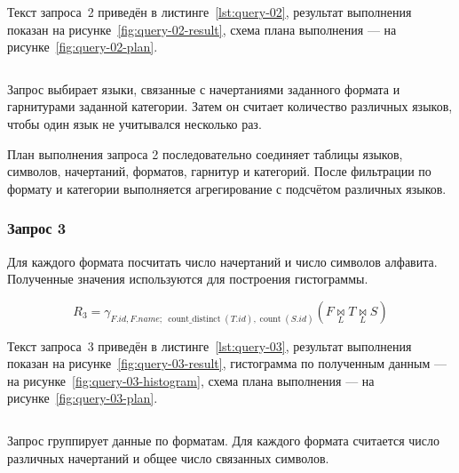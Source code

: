 Текст запроса~2 приведён в листинге~\ref{lst:query-02}, результат выполнения показан на рисунке~\ref{fig:query-02-result}, схема плана выполнения --- на рисунке~\ref{fig:query-02-plan}.

\label{lst:query-02}
\vspace{-10pt}
\inputminted[linenos, numbersep=10pt, firstnumber=1, fontsize=\small]{sql}{../src/queries/query_02.sql}

Запрос выбирает языки, связанные с начертаниями заданного формата и гарнитурами заданной категории. Затем он считает количество различных языков, чтобы один язык не учитывался несколько раз.


План выполнения запроса 2 последовательно соединяет таблицы языков, символов, начертаний, форматов, гарнитур и категорий. После фильтрации по формату и категории выполняется агрегирование с подсчётом различных языков.


\subsubsection{Запрос 3}

Для каждого формата посчитать число начертаний и число символов алфавита. Полученные значения используются для построения гистограммы.

\[
R_3 =
\gamma_{F.id,F.name;\ \operatorname{count\_distinct}(T.id),\operatorname{count}(S.id)}
(F \underset{L}{\bowtie} T \underset{L}{\bowtie} S)
\]

Текст запроса~3 приведён в листинге~\ref{lst:query-03}, результат выполнения показан на рисунке~\ref{fig:query-03-result}, гистограмма по полученным данным --- на рисунке~\ref{fig:query-03-histogram}, схема плана выполнения --- на рисунке~\ref{fig:query-03-plan}.

\label{lst:query-03}
\vspace{-10pt}
\inputminted[linenos, numbersep=10pt, firstnumber=1, fontsize=\small]{sql}{../src/queries/query_03.sql}

Запрос группирует данные по форматам. Для каждого формата считается число различных начертаний и общее число связанных символов.


